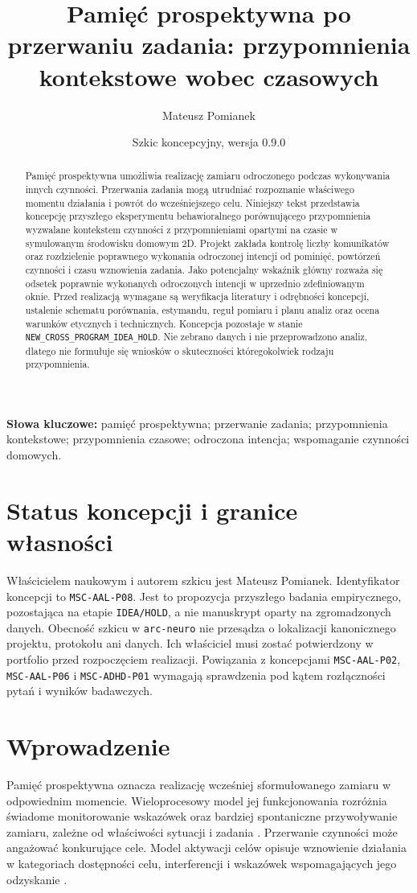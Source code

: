 \documentclass[11pt,a4paper]{article}
\title{Pamięć prospektywna po przerwaniu zadania: przypomnienia kontekstowe wobec czasowych}
\author{Mateusz Pomianek}
\date{Szkic koncepcyjny, wersja 0.9.0}
\begin{document}
\maketitle

\begin{abstract}
Pamięć prospektywna umożliwia realizację zamiaru odroczonego podczas wykonywania innych czynności. Przerwania zadania mogą utrudniać rozpoznanie właściwego momentu działania i powrót do wcześniejszego celu. Niniejszy tekst przedstawia koncepcję przyszłego eksperymentu behawioralnego porównującego przypomnienia wyzwalane kontekstem czynności z przypomnieniami opartymi na czasie w symulowanym środowisku domowym 2D. Projekt zakłada kontrolę liczby komunikatów oraz rozdzielenie poprawnego wykonania odroczonej intencji od pominięć, powtórzeń czynności i czasu wznowienia zadania. Jako potencjalny wskaźnik główny rozważa się odsetek poprawnie wykonanych odroczonych intencji w uprzednio zdefiniowanym oknie. Przed realizacją wymagane są weryfikacja literatury i odrębności koncepcji, ustalenie schematu porównania, estymandu, reguł pomiaru i planu analiz oraz ocena warunków etycznych i technicznych. Koncepcja pozostaje w stanie \texttt{NEW\_CROSS\_PROGRAM\_IDEA\_HOLD}. Nie zebrano danych i nie przeprowadzono analiz, dlatego nie formułuje się wniosków o skuteczności któregokolwiek rodzaju przypomnienia.
\end{abstract}

\noindent\textbf{Słowa kluczowe:} pamięć prospektywna; przerwanie zadania; przypomnienia kontekstowe; przypomnienia czasowe; odroczona intencja; wspomaganie czynności domowych.

\section{Status koncepcji i granice własności}
Właścicielem naukowym i autorem szkicu jest Mateusz Pomianek. Identyfikator koncepcji to \texttt{MSC-AAL-P08}. Jest to propozycja przyszłego badania empirycznego, pozostająca na etapie \texttt{IDEA/HOLD}, a nie manuskrypt oparty na zgromadzonych danych. Obecność szkicu w \texttt{arc-neuro} nie przesądza o lokalizacji kanonicznego projektu, protokołu ani danych. Ich właściciel musi zostać potwierdzony w portfolio przed rozpoczęciem realizacji. Powiązania z koncepcjami \texttt{MSC-AAL-P02}, \texttt{MSC-AAL-P06} i \texttt{MSC-ADHD-P01} wymagają sprawdzenia pod kątem rozłączności pytań i wyników badawczych.

\section{Wprowadzenie}
Pamięć prospektywna oznacza realizację wcześniej sformułowanego zamiaru w odpowiednim momencie. Wieloprocesowy model jej funkcjonowania rozróżnia świadome monitorowanie wskazówek oraz bardziej spontaniczne przywoływanie zamiaru, zależne od właściwości sytuacji i zadania \cite{McDanielEinstein2000}. Przerwanie czynności może angażować konkurujące cele. Model aktywacji celów opisuje wznowienie działania w kategoriach dostępności celu, interferencji i wskazówek wspomagających jego odzyskanie \cite{AltmannTrafton2002}.
\end{document}
